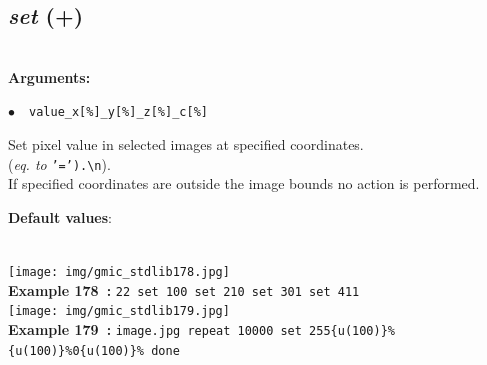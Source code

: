 \documentclass[a4paper,10.5pt,twoside]{book}
\def\comma{\discretionary{,}{}{,}}
\newcommand{\Cb}[1]{\textcolor{cb}{#1}}
\newcommand{\Cc}[1]{\textcolor{cc}{#1}}
\begin{document}
\subsection{\emph{set} (+)}\vspace*{-0.7em}
~\\\textbf{\Cb{Arguments: }}\begin{flushleft}
{\small \Cb{\hspace*{0.5cm}$\bullet$~~\texttt{value{\comma}\_x[\%]{\comma}\_y[\%]{\comma}\_z[\%]{\comma}\_c[\%]}}}\end{flushleft}
Set pixel value in selected images{\comma} at specified coordinates.
~\\(\emph{eq. to} {\small \texttt{'=').\textbackslash n}}).
~\\If specified coordinates are outside the image bounds{\comma} no action is performed.
\begin{flushleft}\Cc{\textbf{Default values}:\\~\\\hspace*{0.5cm}{\small $\bullet$~~\texttt{'x=y=z=c=0'.}}}\end{flushleft}
\begin{center}\texttt{[image: img/gmic\_stdlib178.jpg]}\\
{\footnotesize \textbf{Example 178~:} \texttt{2{\comma}2 set 1{\comma}0{\comma}0 set 2{\comma}1{\comma}0 set 3{\comma}0{\comma}1 set 4{\comma}1{\comma}1}}
\\\texttt{[image: img/gmic\_stdlib179.jpg]}\\
{\footnotesize \textbf{Example 179~:} \texttt{image.jpg repeat 10000 set 255{\comma}\{u(100)\}\%{\comma}\{u(100)\}\%{\comma}0{\comma}\{u(100)\}\% done}}
\end{center}
\end{document}
